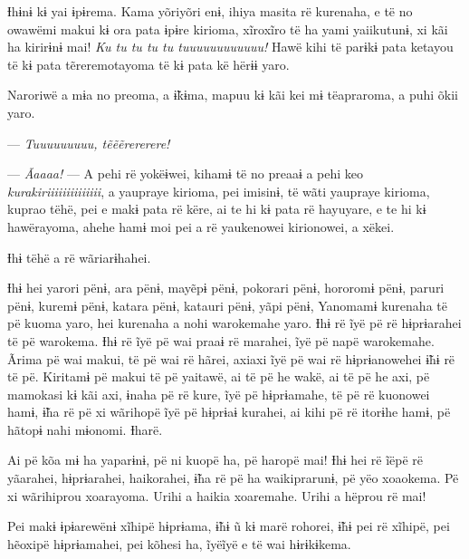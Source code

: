 
Ɨhɨnɨ kɨ yai ɨpɨrema. Kama yõriyõri enɨ, ihiya masita rë kurenaha, e të
no owawëmi makui kɨ ora pata ɨpɨre kirioma, xĩroxĩro të ha yami
yaiikutunɨ, xi kãi ha kirirɨnɨ mai! \textit{Ku tu tu tu tu tuuuuuuuuuuuu!} Hawë
kihi të parɨkɨ pata ketayou të kɨ pata tẽreremotayoma të kɨ pata kë
hërɨɨ yaro. 

Naroriwë a mɨa no preoma, a ɨ̃kɨma, mapuu kɨ kãi kei mɨ tëapraroma, a
puhi õkii yaro. 

--- \textit{Tuuuuuuuuu, tẽẽẽrererere!} 


--- \textit{Ãaaaa!} --- A pehi rë yokëɨwei, kihamɨ të no preaaɨ a pehi keo
\textit{kurakiriiiiiiiiiiiiii}, a yaupraye kirioma, pei imisinɨ, të wãti yaupraye
kirioma, kuprao tëhë, pei e makɨ pata rë këre, ai te hi kɨ pata rë
hayuyare, e te hi kɨ hawërayoma, ahehe hamɨ moi pei a rë yaukenowei
kirionowei, a xëkei. 

Ɨhɨ tëhë a rë wãriarɨhahei. 

Ɨhɨ hei yarori pënɨ, ara pënɨ, mayẽpɨ pënɨ, pokorari pënɨ, hororomɨ
pënɨ, paruri pënɨ, kuremɨ pënɨ, katara pënɨ, katauri pënɨ, yãpi pënɨ,
Yanomamɨ kurenaha të pë kuoma yaro, hei kurenaha a nohi warokemahe yaro.
Ɨhɨ rë ĩyë pë rë hɨprɨarahei të pë warokema. Ɨhɨ rë ĩyë pë wai praaɨ rë
marahei, ĩyë pë napë warokemahe. Ãrima pë wai makui, të pë wai rë hãrei,
axiaxi ĩyë pë wai rë hɨprɨanowehei ɨ̃hɨ rë të pë. Kiritamɨ pë makui të pë
yaitawë, ai të pë he wakë, ai të pë he axi, pë mamokasi kɨ kãi axi,
ɨnaha pë rë kure, ĩyë pë hɨprɨamahe, të pë rë kuonowei hamɨ, ɨ̃ha rë pë
xi wãrihopë ĩyë pë hɨprɨaɨ kurahei, ai kihi pë rë itorɨhe hamɨ, pë
hãtopɨ nahi mɨonomi. Ɨharë. 

Ai pë kõa mɨ ha yaparɨnɨ, pë ni kuopë ha, pë haropë mai! Ɨhɨ hei rë ĩëpë
rë yãarahei, hɨprɨarahei, haikorahei, ɨ̃ha rë pë ha waikiprarunɨ, pë yëo
xoaokema. Pë xi wãrihiprou xoarayoma. Urihi a haikia xoaremahe. Urihi a
hëprou rë mai! 


Pei makɨ ɨpɨarewënɨ xĩhipë hɨprɨama, ɨ̃hɨ ũ kɨ marë rohorei, ɨ̃hɨ pei rë
xĩhipë, pei hẽoxipë hɨprɨamahei, pei kõhesi ha, ĩyëĩyë e të wai
hɨrɨkɨkema. 

